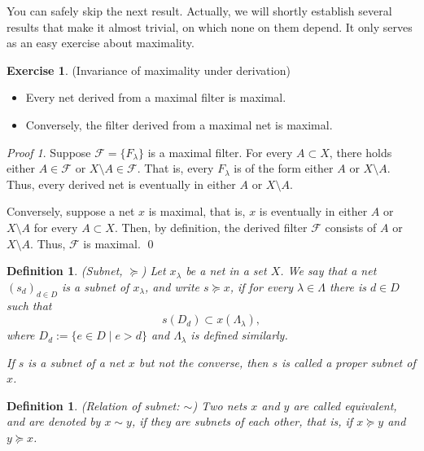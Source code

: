 \documentclass[a4paper,12pt]{article}
\newtheorem{dfn}[thm]{Definition}
\theoremstyle{remark}
\newtheorem*{prf}{Proof}
\theoremstyle{definition}
\theoremstyle{definition}
\theoremstyle{definition}
\newtheorem{exe}[thm]{Exercise}
\begin{document}
You can safely skip the next result. Actually, we will shortly establish several results that make it almost trivial, on which none on them depend. It only serves as an easy exercise about maximality.
\begin{exe}\label{invariance maximality} (Invariance of maximality under derivation)
	\begin{itemize}
		\item Every net derived from a maximal filter is maximal.
		\item Conversely, the filter derived from a maximal net is maximal.
	\end{itemize}
\end{exe}
\begin{prf}
	Suppose \( \mathscr{F} = \{F_{\lambda}\} \) is a maximal filter. For every \( A \subset X \), there holds either \( A \in \mathscr{F} \) or \( X \setminus A \in \mathscr{F} \). That is, every \( F_{\lambda} \) is of the form either \( A \) or \( X \setminus A \). Thus, every derived net is eventually in either \( A \) or \( X \setminus A\).

	Conversely, suppose a net \( x \) is maximal, that is, \( x \) is eventually in either \( A \) or \( X \setminus A \) for every \( A \subset X \). Then, by definition, the derived filter \( \mathscr{F} \) consists of \( A \) or \( X \setminus A \). Thus, \( \mathscr{F} \) is maximal.
	\qed\end{prf}

\begin{dfn} (Subnet, \( \succeq \))
	Let \( x_{\lambda} \) be a net in a set \( X \). We say that a net \( \left( s_d \right)_{d \in D} \) is a subnet of \( x_{\lambda} \), and write \( s \succeq x \), if for every \( \lambda \in \Lambda \) there is \( d \in D \) such that
	\begin{equation*}
		s(D_d) \subset x(\Lambda_{\lambda}),
	\end{equation*}
	where \( D_d:=\{ e \in D \mid e >d \} \) and \( \Lambda_{\lambda} \) is defined similarly.

	If \( s \) is a subnet of a net \( x \) but not the converse, then \( s \) is called a proper subnet of \( x \).
\end{dfn}

\begin{dfn} (Relation of subnet: \( \sim \))
	Two nets \( x \) and \( y \) are called equivalent, and are denoted by \( x \sim y \), if they are subnets of each other, that is, if \( x \succeq y \) and \( y \succeq x \).
\end{dfn}
\end{document}
